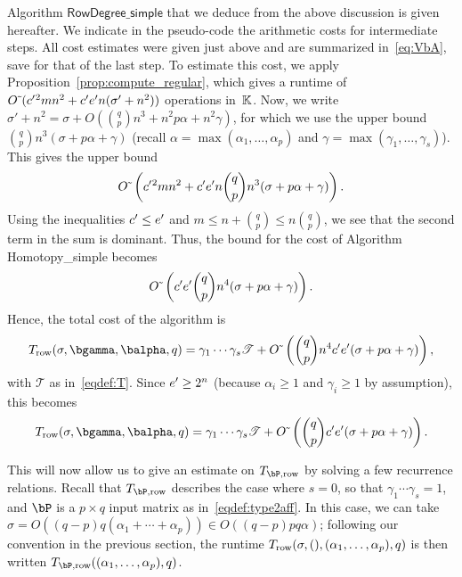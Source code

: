 \documentclass[12pt]{article}
\begin{document}
Algorithm $\mathsf{RowDegree\_simple}$ that we deduce from the above
discussion is given hereafter. We indicate in the pseudo-code the
arithmetic costs for intermediate steps. All cost estimates were given
just above and are summarized in~\eqref{eq:VbA}, save for that of the
last step. To estimate this cost, we apply
Proposition~\ref{prop:compute_regular}, which gives a runtime of
${O}{\,\tilde{ }\,}({c'}{}^2 m n^2 + {c'}{} {e'}{} n (\sigma' + n^2))$ operations in~$\mathbb{K}$.
Now, we write $\sigma'+ n^2 = \sigma +O( {q \choose p} n^3 + n^2 p
\alpha + n^2 \gamma)$, for which we use the upper bound ${q \choose p}
n^3(\sigma + p\alpha + \gamma)$ (recall $\alpha=\max(\alpha_1, \ldots,
\alpha_p)$ and $\gamma=\max(\gamma_1, \ldots, \gamma_s)$).  This gives
the upper bound
\[
{O}{\,\tilde{ }\,}\left ({c'}{}^2 m n^2 + {c'}{}{e'}{} n {q \choose p} n^3(\sigma + p\alpha + \gamma )\right ).
\]
Using the inequalities ${c'}{} \le {e'}{}$ and $m\leq n + {q \choose p} \le n {q \choose p}$,
we see that the second term in the sum is dominant.
Thus, the bound for the cost of Algorithm {\sf Homotopy\_simple} becomes
\[
{O}{\,\tilde{ }\,}\left ( {c'}{}{e'}{} {q \choose p} n^4(\sigma + p\alpha + \gamma) \right ).
\]
Hence, the total cost of the algorithm is
\begin{align*}
  T_{\rm row}(\sigma,\bgamma,\balpha,q)= \gamma_1 \cdots\gamma_s \mathscr{T} +
  \softO\left (  {q \choose p} n^4 \rc  \re ( \sigma + p \alpha +\gamma )  \right ),  
\end{align*}
with $\mathscr{T}$ as in~\eqref{eqdef:T}. Since ${e'}{} \ge 2^n$ (because
$\alpha_i\geq 1$ and $\gamma_i\geq 1$ by assumption), this becomes
\begin{align}\label{eq:recT}
  T_{\rm row}(\sigma,\bgamma,\balpha,q)= \gamma_1 \cdots\gamma_s \mathscr{T} +
  \softO\left (  {q \choose p}  \rc  \re ( \sigma + p \alpha +\gamma )  \right ).
\end{align}

This will now allow us to give an estimate on $T_{\bP,{\rm row}}$ by
solving a few recurrence relations. Recall that $T_{\bP,{\rm row}}$ describes
the case where $s=0$, so that $\gamma_1 \cdots \gamma_s=1$, and $\bP$
is a $p \times q$ input matrix as in~\eqref{eqdef:type2aff}. In this
case, we can take $\sigma=O((q-p) q(\alpha_1 + \cdots + \alpha_p)) \in
O((q-p)pq\alpha)$; following our convention in the previous section,
the runtime $T_{\rm row}(\sigma,(),(\alpha_1,\dots,\alpha_p),q)$ is
then written $T_{\bP,{\rm row}}((\alpha_1,\dots,\alpha_p),q)$.
\end{document}
